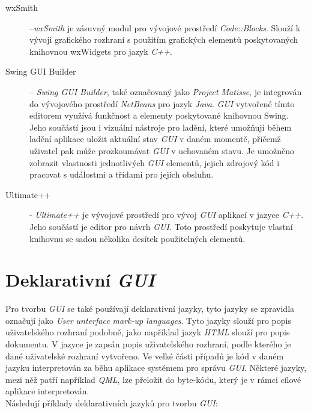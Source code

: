 \documentclass[11pt,twoside,a4paper]{book}
\begin{document}
\begin{description}
\item [wxSmith] –\textit{wxSmith} je zásuvný modul pro vývojové prostředí \textit{Code::Blocks}. Slouží k vývoji grafického rozhraní s použitím grafických elementů poskytovaných knihovnou wxWidgets pro jazyk \textit{C++}. \cite{bib:wxSmith}
\item [Swing GUI Builder] – \textit{Swing GUI Builder}, také označovaný jako \textit{Project Matisse}, je integrován do vývojového prostředí \textit{NetBeans} pro jazyk \textit{Java}.  \textit{GUI} vytvořené tímto editorem využívá funkčnost a elementy poskytované knihovnou Swing. Jeho součástí jsou i vizuální nástroje pro ladění, které umožňují během ladění aplikace uložit aktuální stav \textit{GUI} v daném momentě, přičemž uživatel pak může prozkoumávat \textit{GUI} v uchovaném stavu. Je umožněno zobrazit vlastnosti jednotlivých \textit{GUI} elementů, jejich zdrojový kód i pracovat s událostmi a třídami pro jejich obsluhu. \cite{bib:swingBuilder}
\item[Ultimate++] - \textit{Ultimate++} je vývojové prostředí pro vývoj \textit{GUI} aplikací v jazyce \textit{C++}. Jeho součástí je editor pro návrh \textit{GUI}. Toto prostředí poskytuje vlastní knihovnu se sadou několika desítek použitelných elementů. \cite{bib:ultimate}
\end{description}


\section{\label{SEC:declGUI}Deklarativní \textit{GUI}}
Pro tvorbu \textit{GUI} se také používají deklarativní jazyky, tyto jazyky se zpravidla označují jako \textit{User unterface mark-up languages}. Tyto jazyky slouží pro popis uživatelského rozhraní podobně, jako například jazyk \textit{HTML} slouží pro popis dokumentu. V jazyce je zapsán popis uživatelského rozhraní, podle kterého je dané uživatelské rozhraní vytvořeno. Ve velké části případů je kód v daném jazyku interpretován za běhu aplikace systémem pro správu \textit{GUI}. Některé jazyky, mezi něž patří například \textit{QML}, lze přeložit do byte-kódu, který je v rámci cílové aplikace interpretován.\\
Následují příklady deklarativních jazyků pro tvorbu \textit{GUI}:
\end{document}
